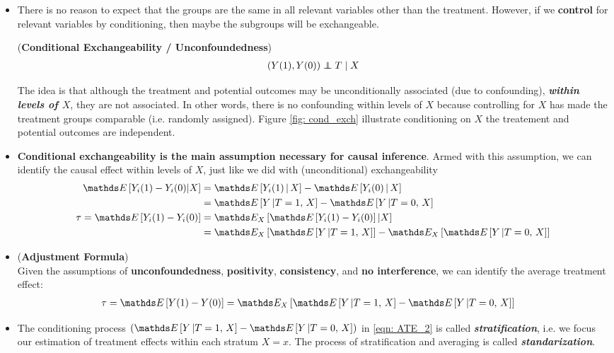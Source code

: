 \documentclass[11pt]{article}
\begin{document}
\begin{itemize}
\item There is no reason to expect that the groups are the same in all relevant variables other than the treatment. However, if we \textbf{control} for relevant variables by conditioning, then maybe the subgroups will be exchangeable. 
\begin{assumption} (\textbf{Conditional Exchangeability / Unconfoundedness}) \citep{neal2020introduction}
\begin{align}
(Y(1), Y(0)) \indep T \;|\; X \label{eqn: conditional_exchangeablity}
\end{align} 
\end{assumption} The idea is that although the treatment and potential outcomes may be unconditionally associated (due to confounding), \textbf{\emph{within levels of $X$}}, they are not associated. In other words, there is no confounding within levels of $X$ because controlling for $X$ has made the treatment groups comparable (i.e. randomly assigned). Figure \ref{fig: cond_exch} illustrate conditioning on $X$ the treatement and potential outcomes are independent.

\item \textbf{Conditional exchangeability is the main assumption necessary for causal inference}. Armed with this assumption, we can identify the causal effect
within levels of $X$, just like we did with (unconditional) exchangeability
\begin{align}
 \E{}{Y_i(1) - Y_i(0) | X} &=  \E{}{Y_i(1) \,|\,X } -\E{}{Y_i(0) \,|\, X} \nonumber\\
 &=  \E{}{Y \,|T=1,\,X } -\E{}{Y \,|T=0, \, X} \label{eqn: cond_ATE} \\
\tau= \E{}{Y_i(1) - Y_i(0)}&=\E{X}{ \E{}{Y_i(1) - Y_i(0)}|X} \nonumber\\
 &= \E{X}{ \E{}{Y \,|T=1,\,X }} - \E{X}{\E{}{Y \,|T=0, \, X}} \label{eqn: ATE_2} 
\end{align}


\item \begin{theorem}(\textbf{Adjustment Formula})  \citep{neal2020introduction}\\
Given the assumptions of \textbf{unconfoundedness}, \textbf{positivity}, \textbf{consistency}, and \textbf{no interference}, we can identify the average treatment effect:
\begin{align*}
\tau= \E{}{Y(1) - Y(0)} &= \E{X}{ \E{}{Y \,|T=1,\,X }- \E{}{Y \,|T=0, \, X}}  
\end{align*}
\end{theorem}

\item The conditioning process $(\E{}{Y \,|T=1,\,X }- \E{}{Y \,|T=0, \, X})$ in \eqref{eqn: ATE_2} is called \textbf{\emph{stratification}}, i.e. we focus our estimation of treatment effects within each stratum $X=x$. The process of stratification and averaging is called  \emph{\textbf{standarization}}.
\end{itemize}
\end{document}
